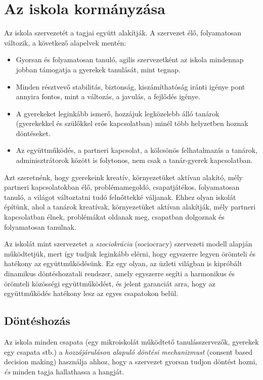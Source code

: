 \section{Az iskola kormányzása}
\label{sec:az_iskola_kormanyzasa}
Az iskola szervezetét a tagjai együtt alakítják. A szervezet élő, folyamatosan változik, a következő alapelvek mentén:

\begin{itemize}

  \item
        Gyorsan és folyamatosan tanuló, agilis szervezetként az iskola min\-den\-nap jobban támogatja a gyerekek tanulását, mint tegnap.
  \item
        Minden résztvevő stabilitás, biztonság, kiszámíthatóság iránti igénye pont annyira fontos, mint a változás, a javulás, a fejlődés igénye.
  \item
        A gyerekeket leginkább ismerő, hozzájuk legközelebb álló tanárok (gyerekekkel és szülőkkel erős kapcsolatban) minél több helyzetben hoznak döntéseket.
  \item
        Az együttműködés, a partneri kapcsolat, a kölcsönös felhatalmazás a tanárok, adminisztrátorok között is folytonos, nem csak a tanár-gyerek kapcsolatban.
\end{itemize}

Azt szeretnénk, hogy gyerekeink kreatív, környezetüket aktívan alakító, mély partneri kapcsolatokban élő, problémamegoldó, csapatjátékos, folyamatosan tanuló, a világot változtatni tudó felnőttekké váljanak. Ehhez olyan iskolát építünk, ahol a tanárok kreatívak, környezetüket aktívan alakítják, mély partneri kapcsolatban élnek, problémákat oldanak meg, csapatban dolgoznak és folyamatosan tanulnak.

Az iskolát mint szervezetet a \emph{szociokrácia} (sociocracy) szervezeti modell alapján működtetjük, mert így tudjuk leginkább elérni, hogy egyszerre legyen örömteli és hatékony az együttműködésünk. Ez egy olyan, az üzleti világban is kipróbált dinamikus döntéshozatali rendszer, amely egyszerre segíti a harmonikus és örömteli közösségi együttműködést, és jelent garanciát arra, hogy az együttműködés hatékony lesz az egyes csapatokon belül.

\subsection{Döntéshozás}
\label{sec:consent_based}

Az iskola minden csapata (egy mikroiskolát működtető tanulásszervezők, gyerekek egy csapata stb.) a \emph{hozzájáruláson alapuló döntési mechanizmust} (consent based decision making) használja ahhoz, hogy a szervezet gyorsan tudjon döntést hozni, \emph{és} minden tagja hallathassa a hangját.

